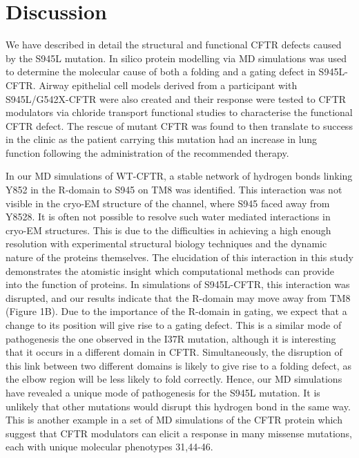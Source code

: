\section{Discussion}
We have described in detail the structural and functional CFTR defects caused by the S945L mutation. In silico protein modelling via MD simulations was used to determine the molecular cause of both a folding and a gating defect in S945L-CFTR.   Airway epithelial cell models derived from a participant with S945L/G542X-CFTR were also created and their response were tested to CFTR modulators via chloride transport functional studies to characterise the functional CFTR defect. The rescue of mutant CFTR was found to then translate to success in the clinic as the patient carrying this mutation had an increase in lung function following the administration of the recommended therapy.

In our MD simulations of WT-CFTR, a stable network of hydrogen bonds linking Y852 in the R-domain to S945 on TM8 was identified. This interaction was not visible in the cryo-EM structure of the channel, where S945 faced away from Y8528. It is often not possible to resolve such water mediated interactions in cryo-EM structures. This is due to the difficulties in achieving a high enough resolution with experimental structural biology techniques and the dynamic nature of the proteins themselves. The elucidation of this interaction in this study demonstrates the atomistic insight which computational methods can provide into the function of proteins. In simulations of S945L-CFTR, this interaction was disrupted, and our results indicate that the R-domain may move away from TM8 (Figure 1B). Due to the importance of the R-domain in gating, we expect that a change to its position will give rise to a gating defect. This is a similar mode of pathogenesis the one observed in the I37R mutation, although it is interesting that it occurs in a different domain in CFTR. Simultaneously, the disruption of this link between two different domains is likely to give rise to a folding defect, as the elbow region will be less likely to fold correctly. Hence, our MD simulations have revealed a unique mode of pathogenesis for the S945L mutation. It is unlikely that other mutations would disrupt this hydrogen bond in the same way. This is another example in a set of MD simulations of the CFTR protein which suggest that CFTR modulators can elicit a response in many missense mutations, each with unique molecular phenotypes \cite{wong2022,wong2022a,billet2020,sabusap2021}31,44-46. 

